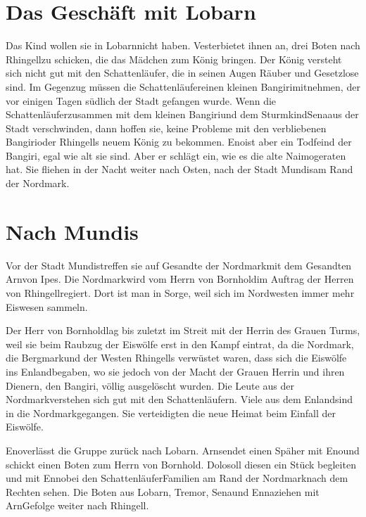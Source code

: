 \documentclass[12pt,a4paper,onecolumn,twoside,ngerman]{book}
\newcommand{\Sena}{Sena}
\newcommand{\Sturmkind}{Sturmkind}
\newcommand{\Bangiri}{Bangiri}
\newcommand{\Enland}{Enland}
\newcommand{\Schattenlaufer}{Schattenläufer}
\newcommand{\Eno}{Eno}
\newcommand{\Dolo}{Dolo}
\newcommand{\Enna}{Enna}
\newcommand{\Enno}{Enno}
\newcommand{\Tremor}{Tremor}
\newcommand{\Lobarn}{Lobarn}
\newcommand{\Vester}{Vester}
\newcommand{\Naimo}{Naimo}
\newcommand{\Nordmark}{Nordmark}
\newcommand{\Bergmark}{Bergmark}
\newcommand{\Ipes}{Ipes}
\newcommand{\Bornhold}{Bornhold}
\newcommand{\Arn}{Arn}
\newcommand{\Rhingell}{Rhingell}
\newcommand{\Mundis}{Mundis}
\begin{document}
\section{Das Geschäft mit \Lobarn}
Das Kind wollen sie in \Lobarn nicht haben. \Vester bietet ihnen an, drei Boten nach \Rhingell zu schicken, die das Mädchen zum König bringen. Der König versteht sich nicht gut mit den \Schattenlaufer, die in seinen Augen Räuber und Gesetzlose sind. Im Gegenzug müssen die \Schattenlaufer einen kleinen \Bangiri mitnehmen, der vor einigen Tagen südlich der Stadt gefangen wurde. 
Wenn die \Schattenlaufer zusammen mit dem kleinen \Bangiri und dem \Sturmkind \Sena aus der Stadt verschwinden, dann hoffen sie, keine Probleme mit den verbliebenen \Bangiri oder \Rhingell{s} neuem König zu bekommen. \Eno ist aber ein Todfeind der \Bangiri{,} egal wie alt sie sind. Aber er schlägt ein, wie es die alte \Naimo geraten hat. Sie fliehen in der Nacht weiter nach Osten, nach der Stadt \Mundis am Rand der \Nordmark .


\section{Nach \Mundis}
Vor der Stadt \Mundis treffen sie auf Gesandte der \Nordmark mit dem Gesandten \Arn von \Ipes{.} Die \Nordmark wird vom Herrn von \Bornhold im Auftrag der Herren von \Rhingell regiert. Dort ist man in Sorge, weil sich im Nordwesten immer mehr Eiswesen sammeln.

Der Herr von \Bornhold lag bis zuletzt im Streit mit der Herrin des Grauen Turms, weil sie beim Raubzug der Eiswölfe erst in den Kampf  eintrat, da die \Nordmark, die \Bergmark und der Westen \Rhingell{s} verwüstet waren, dass sich die Eiswölfe ins \Enland begaben, wo sie jedoch von der Macht der Grauen Herrin und ihren Dienern, den \Bangiri, völlig ausgelöscht wurden. Die Leute aus der \Nordmark verstehen sich gut mit den \Schattenlaufer{n}. Viele aus dem \Enland sind in die \Nordmark gegangen. Sie verteidigten die neue Heimat beim Einfall der Eiswölfe. 

\Eno verlässt die Gruppe zurück nach \Lobarn . \Arn sendet einen Späher mit \Eno und schickt einen Boten zum Herrn von \Bornhold . \Dolo soll diesen ein Stück begleiten und mit \Enno bei den \Schattenlaufer Familien am Rand der \Nordmark nach dem Rechten sehen. Die Boten aus \Lobarn , \Tremor , \Sena und \Enna ziehen mit \Arn Gefolge weiter nach \Rhingell. 
\end{document}
